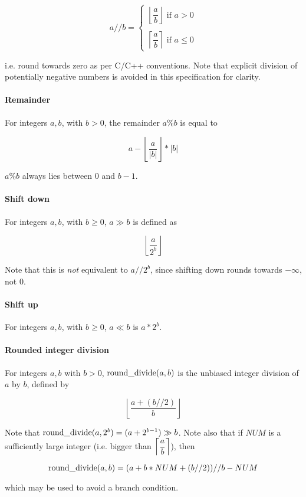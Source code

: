 \[a//b= \left\{ 
\begin{array}{l} 
\left\lfloor \dfrac{a}{b} \right\rfloor \text{ if } a>0 \\
\\
\left\lceil \dfrac{a}{b} \right\rceil \text{ if } a\leq 0
\end{array} \right.
\]

i.e. round towards zero as per C/C++ conventions. Note that explicit division of potentially negative numbers
is avoided in this specification for clarity.

\paragraph*{Remainder} For integers $a,b$, with $b>0$, the remainder $a\%b$ is equal to 

\[a-\left\lfloor\dfrac{a}{\left| b \right|}\right\rfloor *\left| b\right| \]

 $a\%b$ always lies between 0 and $b-1$.

\paragraph*{Shift down} For integers $a,b$, with $b\geq 0$, $a\gg b$ is defined as 

\[\left\lfloor\dfrac{a}{2^b}\right\rfloor \]

Note that this is {\em not} equivalent to $a//2^b$, since shifting down rounds towards $-\infty$, not 0.

\paragraph*{Shift up} For integers $a,b$, with $b\geq 0$, $a\ll b$ is $a*2^b$.

\paragraph*{Rounded integer division} For integers $a,b$ with $b>0$, $\operatorname{round\_divide}(a,b)$ is the unbiased
integer division of $a$ by $b$, defined by

\[\left\lfloor\dfrac{a+(b//2)}{b}\right\rfloor\]

\begin{informative}
Note that $\operatorname{round\_divide}(a,2^b)=(a+2^{b-1})\gg b$. Note also that if $NUM$ is a sufficiently large integer 
(i.e. bigger than $\left\lceil\dfrac{a}{b}\right\rceil$), then

\[\operatorname{round\_divide}(a,b)=(a+b*NUM+(b//2))//b - NUM\]

which may be used to avoid a branch condition.
\end{informative}

